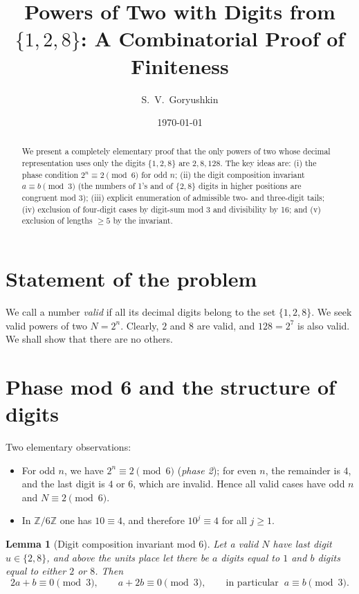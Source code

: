 \documentclass[12pt]{article}
\title{Powers of Two with Digits from $\{1,2,8\}$: A Combinatorial Proof of Finiteness}
\author{S.~V.~Goryushkin}
\date{\today}
\theoremstyle{plain}
\newtheorem{lemma}{Lemma}
\theoremstyle{remark}
\begin{document}
\maketitle

\begin{abstract}
We present a completely elementary proof that the only powers of two whose decimal representation uses only the digits $\{1,2,8\}$ are $2,8,128$. The key ideas are: (i) the phase condition $2^n\equiv2\pmod6$ for odd $n$; (ii) the digit composition invariant $a\equiv b\pmod3$ (the numbers of 1's and of $\{2,8\}$ digits in higher positions are congruent mod 3); (iii) explicit enumeration of admissible two- and three-digit tails; (iv) exclusion of four-digit cases by digit-sum mod 3 and divisibility by 16; and (v) exclusion of lengths $\ge5$ by the invariant.
\end{abstract}

\section{Statement of the problem}
We call a number \emph{valid} if all its decimal digits belong to the set $\{1,2,8\}$.  
We seek valid powers of two $N=2^n$.  
Clearly, $2$ and $8$ are valid, and $128=2^7$ is also valid.  
We shall show that there are no others.

\section{Phase mod 6 and the structure of digits}
Two elementary observations:
\begin{itemize}[nosep]
\item For odd $n$, we have $2^n\equiv2\pmod6$ (\emph{phase 2}); for even $n$, the remainder is $4$, and the last digit is $4$ or $6$, which are invalid. Hence all valid cases have odd $n$ and $N\equiv2\pmod6$.
\item In $\mathbb Z/6\mathbb Z$ one has $10\equiv4$, and therefore $10^j\equiv4$ for all $j\ge1$.
\end{itemize}

\begin{lemma}[Digit composition invariant mod 6]\label{lem:inv}
Let a valid $N$ have last digit $u\in\{2,8\}$, and above the units place let there be
$a$ digits equal to $1$ and $b$ digits equal to either $2$ or $8$.  
Then
\begin{equation}\label{eq:ab}
2a+b\equiv0\pmod3,\qquad a+2b\equiv0\pmod3,\qquad\text{in particular }~ a\equiv b\pmod3.
\end{equation}
\end{lemma}
\end{document}
